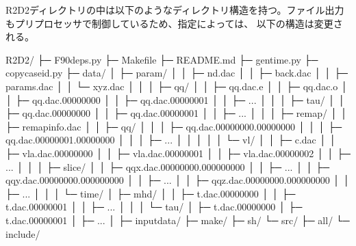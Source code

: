 \documentclass[letterpaper,10pt,dvipdfmx,report]{sphinxmanual}
\begin{document}
\sphinxAtStartPar
R2D2ディレクトリの中は以下のようなディレクトリ構造を持つ。ファイル出力もプリプロセッサで制御しているため、指定によっては、  以下の構造は変更される。

\begin{sphinxVerbatim}[commandchars=\\\{\}]
R2D2/
   ├─ F90\PYGZus{}deps.py
   ├─ Makefile
   ├─ README.md
   ├─ gen\PYGZus{}time.py
   ├─ copy\PYGZus{}caseid.py
   ├─ data/
   │     ├─ param/
   │     │      ├─ nd.dac
   │     │      ├─ back.dac
   │     │      ├─ params.dac
   │     │      └─ xyz.dac
   │     │
   │     ├─ qq/
   │     │   ├─ qq.dac.e
   │     │   ├─ qq.dac.o
   │     │   ├─ qq.dac.00000000
   │     │   ├─ qq.dac.00000001
   │     │   ├─ ...
   │     │
   │     ├─ tau/
   │     │   ├─ qq.dac.00000000
   │     │   ├─ qq.dac.00000001
   │     │   ├─ ...
   │     │
   │     ├─ remap/
   │     │      ├─ remap\PYGZus{}info.dac
   │     │      ├─ qq/
   │     │      │   ├─ qq.dac.00000000.00000000
   │     │      │   ├─ qq.dac.00000001.00000000
   │     │      │   ├─ ...
   │     │      │
   │     │      └─ vl/
   │     │          ├─ c.dac
   │     │          ├─ vla.dac.00000000
   │     │          ├─ vla.dac.00000001
   │     │          ├─ vla.dac.00000002
   │     │          ├─ ...
   │     │
   │     ├─ slice/
   │     │   ├─ qqx.dac.00000000.000000000
   │     │   ├─ ...
   │     │   ├─ qqy.dac.00000000.000000000
   │     │   ├─ ...
   │     │   ├─ qqz.dac.00000000.000000000
   │     │   ├─ ...
   │     │
   │     └─ time/
   │           ├─ mhd/
   │           │    ├─ t.dac.00000000
   │           │    ├─ t.dac.00000001
   │           │    ├─ ...
   │           │
   │           └─ tau/
   │                ├─ t.dac.00000000
   │                ├─ t.dac.00000001
   │                ├─ ...
   │
   ├─ input\PYGZus{}data/
   ├─ make/
   ├─ sh/
   └─ src/
        ├─ all/
        └─ include/
\end{sphinxVerbatim}
\end{document}
